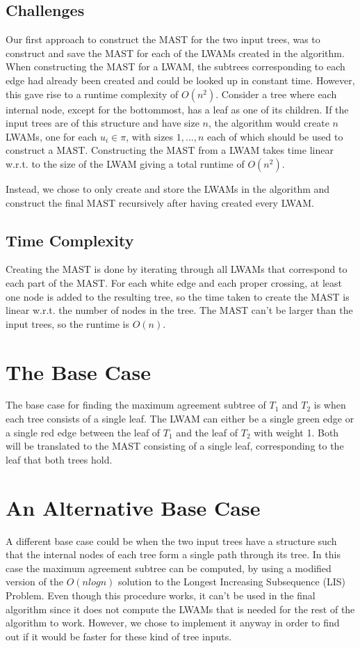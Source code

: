 \subsection{Challenges} 
Our first approach to construct the MAST for the two input trees, was to construct and save the MAST for each of the LWAMs created in the algorithm. When constructing the MAST for a LWAM, the subtrees corresponding to each edge had already been created and could be looked up in constant time. However, this gave rise to a runtime complexity of $O(n^2)$. Consider a tree where each internal node, except for the bottommost, has a leaf as one of its children. If the input trees are of this structure and have size $n$, the algorithm would create $n$ LWAMs, one for each $u_i \in \pi$, with sizes $1, ..., n$ each of which should be used to construct a MAST. Constructing the MAST from a LWAM takes time linear w.r.t. to the size of the LWAM giving a total runtime of $O(n^2)$.

Instead, we chose to only create and store the LWAMs in the algorithm and construct the final MAST recursively after having created every LWAM.

\subsection{Time Complexity}
Creating the MAST is done by iterating through all LWAMs that correspond to each part of the MAST. For each white edge and each proper crossing, at least one node is added to the resulting tree, so the time taken to create the MAST is linear w.r.t. the number of nodes in the tree. The MAST can't be larger than the input trees, so the runtime is $O(n)$.

\section{The Base Case}
The base case for finding the maximum agreement subtree of $T_1$ and $T_2$ is when each tree consists of a single leaf. The LWAM can either be a single green edge or a single red edge between the leaf of $T_1$ and the leaf of $T_2$ with weight 1. Both will be translated to the MAST consisting of a single leaf, corresponding to the leaf that both trees hold.

\section{An Alternative Base Case}
A different base case could be when the two input trees have a structure such that the internal nodes of each tree form a single path through its tree. In this case the maximum agreement subtree can be computed, by using a modified version of the $O(nlogn)$ solution to the Longest Increasing Subsequence (LIS) Problem. Even though this procedure works, it can't be used in the final algorithm since it does not compute the LWAMs that is needed for the rest of the algorithm to work. However, we chose to implement it anyway in order to find out if it would be faster for these kind of tree inputs.

